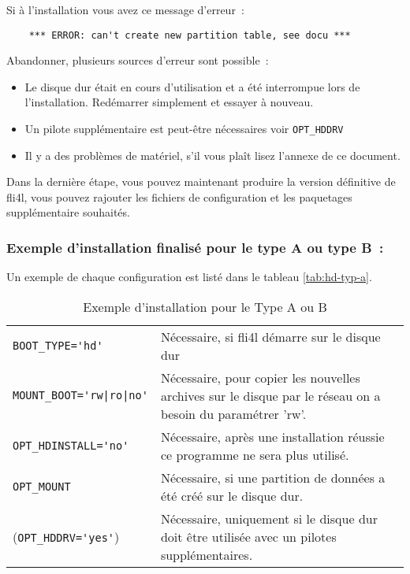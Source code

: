     Si à l'installation vous avez ce message d'erreur~:
\begin{example}
\begin{verbatim}
    *** ERROR: can't create new partition table, see docu ***
\end{verbatim}
\end{example}
       Abandonner, plusieurs sources d'erreur sont possible~:
        \begin{itemize}
        \item Le disque dur était en cours d'utilisation et a été interrompue 
        lors de l'installation. Redémarrer simplement et essayer à nouveau.
        \item Un pilote supplémentaire est peut-être nécessaires voir \verb*?OPT_HDDRV?
		\item Il y a des problèmes de matériel, s'il vous plaît lisez l'annexe de ce document.
        \end{itemize}
    Dans la dernière étape, vous pouvez maintenant produire la version définitive
    de fli4l, vous pouvez rajouter les fichiers de configuration et les paquetages
    supplémentaire souhaités.

\subsubsection{Exemple d'installation finalisé pour le type A ou type B~:}

Un exemple de chaque configuration est listé dans le tableau \ref{tab:hd-typ-a}.

\begin{table}[htb]
  \begin{center}
    \begin{small}
    \begin{tabular}{lp{9cm}}
    \verb*?BOOT_TYPE='hd'? & Nécessaire, si fli4l démarre sur le disque dur\\

    \verb*?MOUNT_BOOT='rw|ro|no'? & 
                        Nécessaire, pour copier les nouvelles archives sur le
                        disque par le réseau on a besoin du paramétrer 'rw'.\\

    \verb*?OPT_HDINSTALL='no'? & Nécessaire, après une installation réussie ce
                        programme ne sera plus utilisé.\\

    \verb*?OPT_MOUNT? & Nécessaire, si une partition de données a été créé sur
                         le disque dur.\\

    (\verb*?OPT_HDDRV='yes'?) & Nécessaire, uniquement si le disque dur doit
                        être utilisée avec un pilotes supplémentaires.\\
    \end{tabular}
    \end{small}
    \caption{Exemple d'installation pour le Type A ou B}
  \end{center}
\end{table}

